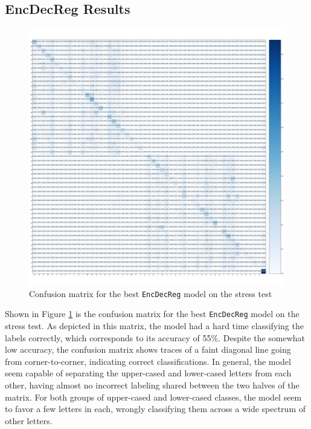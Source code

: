 \subsection{EncDecReg Results}
\begin{figure}[H]
    \centering
    \includegraphics[width=1\textwidth]{fig/results/experiment4/encdecreg/confusion_matrix.png}
    \caption{Confusion matrix for the best {\tt EncDecReg} model on the stress test}
    \label{fig:result4_encdecreg_confusion_matrix}
\end{figure}

Shown in Figure \ref{fig:result4_encdecreg_confusion_matrix} is the confusion matrix for the best {\tt EncDecReg} model on the stress test. As depicted in this matrix, the model had a hard time classifying the labels correctly, which corresponds to its accuracy of 55\%. Despite the somewhat low accuracy, the confusion matrix shows traces of a faint diagonal line going from corner-to-corner, indicating correct classifications. In general, the model seem capable of separating the upper-cased and lower-cased letters from each other, having almost no incorrect labeling shared between the two halves of the matrix. For both groups of upper-cased and lower-cased classes, the model seem to favor a few letters in each, wrongly classifying them across a wide spectrum of other letters.

